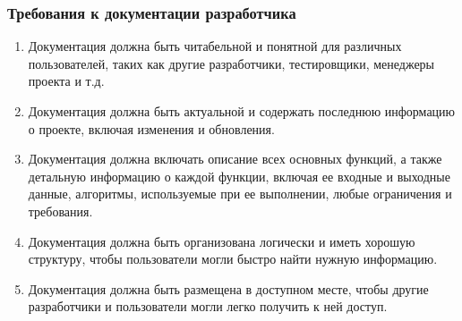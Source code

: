 \documentclass[14pt, a4paper]{extarticle}
\begin{document}
\subsubsection*{Требования к документации разработчика}

\begin{enumerate}
\item Документация должна быть читабельной и понятной для различных пользователей, таких как другие разработчики, тестировщики, менеджеры проекта и т.д.
\item Документация должна быть актуальной и содержать последнюю информацию о проекте, включая изменения и обновления.
\item Документация должна включать описание всех основных функций, а также детальную информацию о каждой функции, включая ее входные и выходные данные, алгоритмы, используемые при ее выполнении, любые ограничения и требования.
\item Документация должна быть организована логически и иметь хорошую структуру, чтобы пользователи могли быстро найти нужную информацию.
\item Документация должна быть размещена в доступном месте, чтобы другие разработчики и пользователи могли легко получить к ней доступ.
\end{enumerate}
\end{document}

